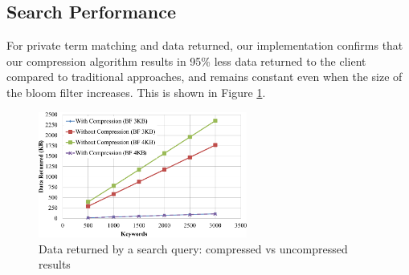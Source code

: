 \subsection{Search Performance}

For private term matching and data returned, our implementation confirms
that our compression algorithm results in 95\% less data returned to the client
compared to traditional approaches, and remains constant even when the size
of the bloom filter increases. This is shown in Figure \ref{fig:compress}.

\begin{figure}[h!]
  \centering
  \includegraphics[width=2.7in]{figures/comp_compare.png}
  \vspace{-10px}
  \caption{Data returned by a search query: compressed vs uncompressed results}
  \vspace{-5px}

  \label{fig:compress}
\end{figure}


%

